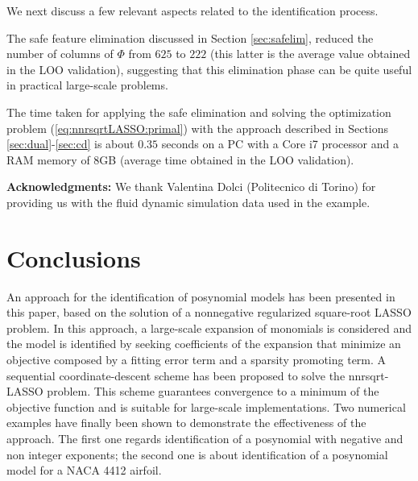 \documentclass[11pt]{article}
\begin{document}
We next discuss a few relevant aspects related to the identification
process.

The safe feature elimination discussed in Section \ref{sec:safelim},
reduced the number of columns of $\Phi$ from $625$ to $222$ (this
latter is the average value obtained in the LOO validation), suggesting
that this elimination phase can be quite useful in practical large-scale
problems.

The time taken for applying the safe elimination and solving the optimization
problem (\ref{eq:nnrsqrtLASSO:primal}) with the approach described
in Sections \ref{sec:dual}-\ref{sec:cd} is about $0.35$ seconds
on a PC with a Core i7 processor and a RAM memory of 8GB (average
time obtained in the LOO validation).

{\bf Acknowledgments:}
We thank Valentina Dolci (Politecnico di Torino) for providing us
with the fluid dynamic simulation data used in the example.

\section{Conclusions}

An approach for the identification of posynomial models has been presented in this paper, based on the solution of a nonnegative regularized square-root LASSO  problem. In this approach, a large-scale expansion of monomials is considered and the model is identified by seeking coefficients of the expansion that minimize an objective composed by a fitting error term and a sparsity promoting term. A sequential coordinate-descent scheme has been proposed to solve the nnrsqrt-LASSO problem. This scheme guarantees convergence to a minimum of the objective function and is suitable for large-scale implementations. Two numerical examples have finally been shown to demonstrate the effectiveness of the approach. The first one regards identification of a posynomial with negative and non integer exponents; the second one is about identification of a posynomial model for a NACA 4412 airfoil.



\end{document}
